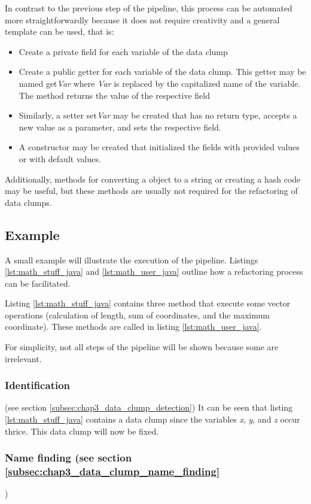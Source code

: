 In contrast to the previous step of the pipeline, this process can be automated more straightforwardly because it does not require creativity and a general template can be used, that is:
\begin{itemize}
    \item Create a private field for each variable of the data clump
    \item Create a public getter for each variable of the data clump. This getter may be named get\textit{Var} where \textit{Var} is replaced by the capitalized name of the variable. The method returns the value of the respective field
    \item Similarly, a setter set\textit{Var} may be created that has no return type, accepts a new value as a parameter, and sets the respective field. 
    \item A constructor may be created that initialized the fields with provided values or with default values. 
\end{itemize}

Additionally, methods for converting a object to a string or creating a hash code may be useful, but these methods are usually not required for the refactoring of data clumps. 

\subsection{Example}
A small example will illustrate the execution of the pipeline. Listings \ref{lst:math_stuff_java} and \ref{lst:math_user_java} outline how a refactoring process can be facilitated.  

Listing \ref{lst:math_stuff_java} contains three method that execute some vector operations (calculation of length, sum of coordinates, and the maximum coordinate). These methods are called in listing \ref{lst:math_user_java}. 

For simplicity, not all steps of the pipeline will be shown because some are irrelevant.
\subsubsection{Identification} (see section \ref{subsec:chap3_data_clump_detection})
It can be seen that  listing \ref{lst:math_stuff_java} contains a data clump since the variables \textit{x}, \textit{y}, and  \textit{z} occur thrice. This data clump will now be fixed.
\subsubsection{Name finding (see section \ref{subsec:chap3_data_clump_name_finding}})

